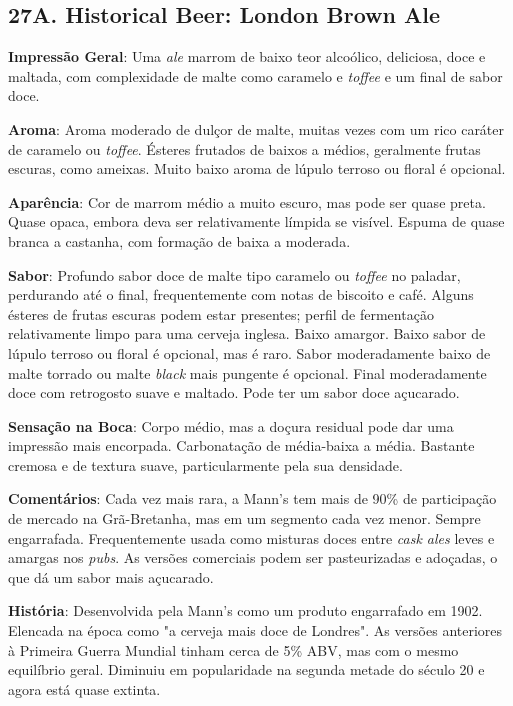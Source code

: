 \subsection*{27A. Historical Beer: London Brown Ale}
\textbf{Impressão Geral}: Uma \textit{ale} marrom de baixo teor alcoólico, deliciosa, doce e maltada, com complexidade de malte como caramelo e \textit{toffee} e um final de sabor doce.

\textbf{Aroma}: Aroma moderado de dulçor de malte, muitas vezes com um rico caráter de caramelo ou \textit{toffee}. Ésteres frutados de baixos a médios, geralmente frutas escuras, como ameixas. Muito baixo aroma de lúpulo terroso ou floral é opcional.

\textbf{Aparência}: Cor de marrom médio a muito escuro, mas pode ser quase preta. Quase opaca, embora deva ser relativamente límpida se visível. Espuma de quase branca a castanha, com formação de baixa a moderada.

\textbf{Sabor}: Profundo sabor doce de malte tipo caramelo ou \textit{toffee} no paladar, perdurando até o final, frequentemente com notas de biscoito e café. Alguns ésteres de frutas escuras podem estar presentes; perfil de fermentação relativamente limpo para uma cerveja inglesa. Baixo amargor. Baixo sabor de lúpulo terroso ou floral é opcional, mas é raro. Sabor moderadamente baixo de malte torrado ou malte \textit{black} mais pungente é opcional. Final moderadamente doce com retrogosto suave e maltado. Pode ter um sabor doce açucarado.

\textbf{Sensação na Boca}: Corpo médio, mas a doçura residual pode dar uma impressão mais encorpada. Carbonatação de média-baixa a média. Bastante cremosa e de textura suave, particularmente pela sua densidade.

\textbf{Comentários}: Cada vez mais rara, a Mann's tem mais de 90\% de participação de mercado na Grã-Bretanha, mas em um segmento cada vez menor. Sempre engarrafada. Frequentemente usada como misturas doces entre \textit{cask ales} leves e amargas nos \textit{pubs}. As versões comerciais podem ser pasteurizadas e adoçadas, o que dá um sabor mais açucarado.

\textbf{História}: Desenvolvida pela Mann's como um produto engarrafado em 1902. Elencada na época como "a cerveja mais doce de Londres". As versões anteriores à Primeira Guerra Mundial tinham cerca de 5\% ABV, mas com o mesmo equilíbrio geral. Diminuiu em popularidade na segunda metade do século 20 e agora está quase extinta.

